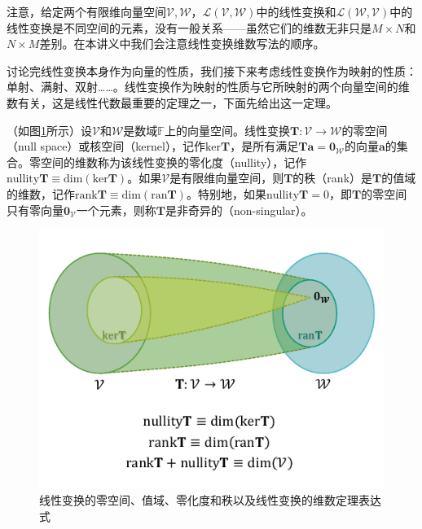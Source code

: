 \documentclass[main.tex]{subfiles}
\begin{document}
注意，给定两个有限维向量空间$\mathcal{V},\mathcal{W}$，$\mathcal{L}\left(\mathcal{V},\mathcal{W}\right)$中的线性变换和$\mathcal{L}\left(\mathcal{W},\mathcal{V}\right)$中的线性变换是不同空间的元素，没有一般关系——虽然它们的维数无非只是$M\times N$和$N\times M$差别。在本讲义中我们会注意线性变换维数写法的顺序。

讨论完线性变换本身作为向量的性质，我们接下来考虑线性变换作为映射的性质：单射、满射、双射……。线性变换作为映射的性质与它所映射的两个向量空间的维数有关，这是线性代数最重要的定理之一，下面先给出这一定理。

\begin{definition}\label{def:II.4.2}
（如图\ref{fig:II.4.1}所示）设$\mathcal{V}$和$\mathcal{W}$是数域$\mathbb{F}$上的向量空间。线性变换$\mathbf{T}:\mathcal{V}\rightarrow\mathcal{W}$的零空间（null space）或核空间（kernel），记作$\mathrm{ker}\mathbf{T}$，是所有满足$\mathbf{Ta}=\mathbf{0}_\mathcal{W}$的向量$\mathbf{a}$的集合。零空间的维数称为该线性变换的零化度（nullity），记作$\mathrm{nullity}\mathbf{T}\equiv\mathrm{dim}\left(\mathrm{ker}\mathbf{T}\right)$。如果$\mathcal{V}$是有限维向量空间，则$\mathbf{T}$的秩（rank）是$\mathbf{T}$的值域的维数，记作$\mathrm{rank}\mathbf{T}\equiv\mathrm{dim}\left(\mathrm{ran}\mathbf{T}\right)$。特别地，如果$\mathrm{nullity}\mathbf{T}=0$，即$\mathbf{T}$的零空间只有零向量$\mathbf{0}_\mathcal{V}$一个元素，则称$\mathbf{T}$是非奇异的（non-singular）。
\end{definition}

\begin{figure}[htbp]
\centering
\includegraphics{images/II.4.1.pdf}
\caption{线性变换的零空间、值域、零化度和秩以及线性变换的维数定理表达式}
\label{fig:II.4.1}
\end{figure}
\end{document}
